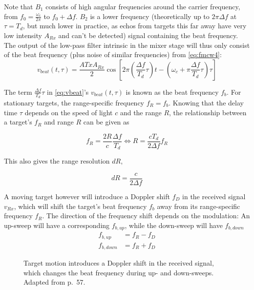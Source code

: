Note that \(B_1\) consists of high angular frequencies around the
carrier frequency, from \(f_0 = \frac{\omega_c}{2\pi}\) to
\(f_0 + \Delta f\). \(B_2\) is a lower frequency (theoretically up to
\(2\pi\Delta f\) at \(\tau = T_d\), but much lower in practice, as echos
from targets this far away have very low intensity \(A_{Rx}\) and can't
be detected) signal containing the beat frequency. The output of the
low-pass filter intrinsic in the mixer stage will thus only consist of
the beat frequency (plus noise of similar frequencies) from \cref{eq:fmcw4}:
\begin{equation} \label{eq:vbeat}
    v_{beat}(t,\tau) = \frac{A{Tx}A_{Rx}}{2} \cos \left[ 2\pi\left(\frac{\Delta f}{T_d}\tau\right)t - \left(\omega_c + \pi\frac{\Delta f}{T_d}\tau \right) \tau \right]
\end{equation}

The term \(\frac{\Delta f}{T_d}\tau\) in \cref{eq:vbeat}'s \(v_{beat}(t,\tau)\) is
known as the beat frequency \(f_b\). For stationary targets, the
range-specific frequency \(f_R = f_b\). Knowing that the delay time
\(\tau\) depends on the speed of light \(c\) and the range \(R\), the
relationship between a target's \(f_R\) and range \(R\) can be given as

\begin{equation}\label{eq:range}
	f_R = \frac{2R}{c} \frac{\Delta f}{T_d} \iff R=\frac{c T_d}{2\Delta f}f_R
\end{equation}

This also gives the range resolution \(dR\),

\begin{equation} \label{eq:rangeres}
	dR = \frac{c}{2 \Delta f}
\end{equation}

A moving target however will introduce a Doppler shift \(f_D\) in the
received signal \(v_{Rx}\), which will shift the target's beat frequency
\(f_b\) away from its range-specific frequency \(f_R\). The direction of
the frequency shift depends on the modulation: An up-sweep will have a
corresponding $f_{b,up}$, while the down-sweep will have $f_{b,down}$
\begin{align}
	f_{b,up}    &= f_R - f_D \label{eq:vbeatup} \\
	f_{b,down}  &= f_R + f_D \label{eq:vbeatdn}
\end{align}

\begin{figure}[htbp]
    \centering
    \def\svgwidth{10cm}
    
    \caption{\label{fig:fmcw_doppler}Target motion introduces a Doppler shift in the received signal, which changes the beat frequency during up- and down-sweeps. Adapted from \cite{Adams2012} p.~57.}
\end{figure}

